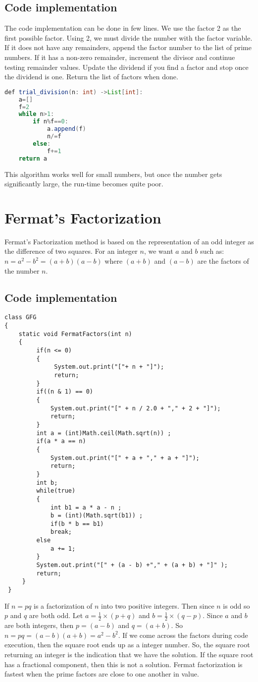 \documentclass[]{article}
\begin{document}
\subsection{Code implementation}
The code implementation can be done in few lines. We use the factor 2 as the first possible factor. Using 2, we must divide the number with the factor variable. If it does not have any remainders, append the factor number to the list of prime numbers. If it has a non-zero remainder, increment the divisor and continue testing remainder values. Update the dividend if you find a factor and stop once the dividend is one. Return the list of factors when done.
\\ 
\begin{lstlisting}[language=Java]
def trial_division(n: int) ->List[int]:
	a=[]
	f=2
	while n>1:
		if n%f==0:
			a.append(f)
			n/=f
		else:
			f+=1
	return a
\end{lstlisting}
This algorithm works well for small numbers, but once the number gets significantly large, the run-time becomes quite poor.

\section{Fermat's Factorization}
Fermat's Factorization method is based on the representation of an odd integer as the difference of two squares. For an integer $n$, we want $a$ and $b$ such as: $n=a^2-b^2=(a+b)(a-b)$ where $(a+b)$ and $(a-b)$ are the factors of the number $n$.
\subsection{Code implementation}
\begin{lstlisting}[basicstyle=\small]
class GFG  
{ 
    static void FermatFactors(int n) 
    { 
         if(n <= 0) 
         { 
              System.out.print("["+ n + "]"); 
              return; 
         } 
         if((n & 1) == 0) 
         { 
             System.out.print("[" + n / 2.0 + "," + 2 + "]");  
             return; 
         } 
         int a = (int)Math.ceil(Math.sqrt(n)) ;  
         if(a * a == n)
         { 
             System.out.print("[" + a + "," + a + "]");  
             return; 	
         } 
         int b; 
         while(true) 
         { 
             int b1 = a * a - n ; 
             b = (int)(Math.sqrt(b1)) ; 
             if(b * b == b1) 
             break; 
         else
             a += 1; 
         } 
         System.out.print("[" + (a - b) +"," + (a + b) + "]" );  
         return; 
     }
 }
\end{lstlisting}
If $n=pq$ is a factorization of $n$ into two positive integers. Then since $n$ is odd so $p$ and $q$ are both odd. Let $a=\frac{1}{2}\times(p+q)$ and $b=\frac{1}{2}\times(q-p)$. Since $a$ and $b$ are both integers, then $p=(a-b)$ and $q=(a+b)$. So $n=pq=(a-b)(a+b)=a^2-b^2$. If we come across the factors during code execution, then the square root ends up as a integer number. So, the square root returning an integer is the indication that we have the solution. If the square root has a fractional component, then this is not a solution. Fermat factorization is fastest when the prime factors are close to one another in value.
 
\end{document}
